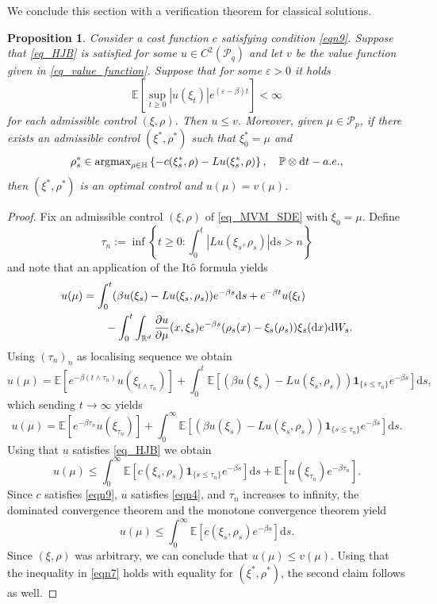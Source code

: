 \documentclass{article}
\newtheorem{proposition}[theorem]{Proposition}
\theoremstyle{definition}
\numberwithin{equation}{section}
\numberwithin{theorem}{section}
\newcommand{\E}{\mathbb{E}}
\renewcommand{\P}{\mathbb{P}}
\newcommand{\R}{\mathbb{R}}
\newcommand{\dx}{\mathrm{d}x}
\newcommand{\ds}{\mathrm{d}s}
\newcommand{\dt}{\mathrm{d}t}
\newcommand{\Hb}{\mathbb{H}}
\renewcommand{\d}{{\rm d}}
\newcommand{\e}{\varepsilon}
\renewcommand{\P}{{\mathbb P}}
\newcommand{\Pcal}{{\mathcal P}}
\begin{document}
We conclude this section with a verification theorem for classical solutions.
\begin{proposition}\label{prop1}
Consider a cost function $c$ satisfying condition \eqref{eqn9}.
Suppose that \eqref{eq_HJB} is satisfied for some $u\in  C^2(\Pcal_q)$
and let $v$ be the value function given in \eqref{eq_value_function}. Suppose that for some $\e>0$ it holds
\begin{equation}\label{eqn4}
\E[\sup_{t\geq0}|u(\xi_t)|e^{(\e-\beta) t}]<\infty
\end{equation}
 for each admissible control $(\xi,\rho)$. Then $u\leq v$. Moreover, given $\mu\in\Pcal_p$, if there exists an admissible control $(\xi^*,\rho^*)$ such that $\xi_0^*=\mu$ and
$$\rho_s^*\in{\textup{argmax}}_{\rho\in\Hb} \left\{ - c(\xi_s^*,\rho) - Lu(\xi_s^*,\rho) \right\},\quad \P\otimes \dt-a.e.,$$
then $(\xi^*,\rho^*)$ is an optimal control and $u(\mu)=v(\mu)$.
\end{proposition}
\begin{proof}
Fix an admissible control $(\xi,\rho)$ of \eqref{eq_MVM_SDE} with $\xi_0=\mu$. Define
$$\tau_n:=\inf\left\{t\geq0\colon\int_0^t  |Lu(\xi_s,\rho_s)|\ds> n\right\}$$
and note that an application of the It\^o formula yields
\begin{align*}
u(\mu)&=\int_0^t(\beta u(\xi_s)-Lu(\xi_s,\rho_s))e^{-\beta s} \ds
+e^{-\beta t}u(\xi_t)\\
&\qquad-\int_0^t \int_{\R^d} \frac{\partial u}{\partial \mu}(x,\xi_s)e^{-\beta s}(\rho_s(x)-\xi_s(\rho_s))\xi_s(\dx) \d W_s.
\end{align*}
Using $(\tau_n)_n$ as localising sequence we obtain
 $$u(\mu)=\E[e^{-\beta (t\land \tau_n)}u(\xi_{t\land \tau_n})]+\int_0^t\E[(\beta u(\xi_{s})-Lu(\xi_s,\rho_s))\bm1_{\{s\leq \tau_n\}}e^{-\beta s}] \ds,$$
which sending $t\to\infty$ yields 
 $$u(\mu)= \E[e^{-\beta  \tau_n}u(\xi_{ \tau_n})]+\int_0^\infty\E[(\beta u(\xi_{s})-Lu(\xi_s,\rho_s))\bm1_{\{s\leq \tau_n\}}e^{-\beta s}] \ds.$$
Using that $u$ satisfies \eqref{eq_HJB} we obtain
 \begin{equation}\label{eqn7}
 u(\mu)\leq \int_0^\infty\E[c(\xi_s,\rho_s)\bm1_{\{s\leq \tau_n\}}e^{-\beta s}] \ds+
\E[ u(\xi_{\tau_n})e^{-\beta\tau_n}] .
\end{equation}
Since $c$ satisfies \eqref{eqn9}, $u$ satisfies \eqref{eqn4}, and $\tau_n$ increases to infinity, the dominated convergence theorem and the monotone convergence theorem yield
 $$u(\mu)\leq \int_0^\infty\E[c(\xi_s,\rho_s)e^{-\beta s}] \ds.$$
 Since $(\xi,\rho)$ was arbitrary, we can conclude that $u(\mu)\leq v(\mu)$. Using that the inequality in \eqref{eqn7} holds with equality for $(\xi^*,\rho^*)$, the second claim follows as well.
\end{proof}
\end{document}
